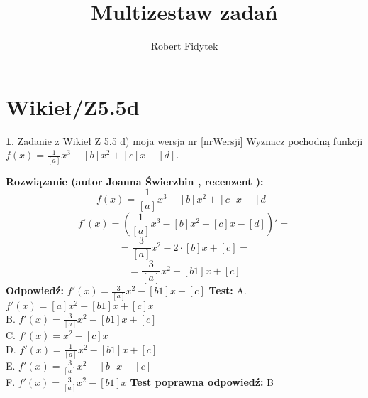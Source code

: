 \documentclass[12pt, a4paper]{article}
\title{Multizestaw zadań}
\author{Robert Fidytek}
\date{}
\theoremstyle{definition} %
\newtheorem{zad}{}
\newcommand{\kategoria}[1]{\section{#1}} %
\newcommand{\zadStart}[1]{\begin{zad}#1\newline} %
\newcommand{\zadStop}{\end{zad}}   %
\newcommand{\rozwStart}[2]{\noindent \textbf{Rozwiązanie (autor #1 , recenzent #2): }\newline} %
\newcommand{\rozwStop}{\newline}                                            %
\newcommand{\odpStart}{\noindent \textbf{Odpowiedź:}\newline}    %
\newcommand{\odpStop}{\newline}                                             %
\newcommand{\testStart}{\noindent \textbf{Test:}\newline} %
\newcommand{\testStop}{\newline} %
\newcommand{\kluczStart}{\noindent \textbf{Test poprawna odpowiedź:}\newline} %
\newcommand{\kluczStop}{\newline} %
\begin{document}
\maketitle


\kategoria{Wikieł/Z5.5d}
\zadStart{Zadanie z Wikieł Z 5.5 d) moja wersja nr [nrWersji]}
%
Wyznacz pochodną funkcji \\ $f(x)=\frac{1}{[a]}x^3-[b]x^2+[c]x-[d]$.
\zadStop
\rozwStart{Joanna Świerzbin}{}
$$f(x)=\frac{1}{[a]}x^3-[b]x^2+[c]x-[d]$$
$$f'(x)=\left(\frac{1}{[a]}x^3-[b]x^2+[c]x-[d]\right)' = $$
$$ = \frac{3}{[a]}x^2-2\cdot[b]x+[c] = $$
$$ =  \frac{3}{[a]}x^2-[b1]x+[c] $$
\rozwStop
\odpStart
$ f'(x)=  \frac{3}{[a]}x^2-[b1]x+[c] $
\odpStop
\testStart
A.$ f'(x)= [a]x^2 - [b1]x+ [c]x $\\
B. $ f'(x)=  \frac{3}{[a]}x^2-[b1]x+[c] $ \\
C. $ f'(x)= x^2- [c]x $ \\
D. $ f'(x)=  \frac{1}{[a]}x^2-[b1]x+[c] $\\
E. $ f'(x)=  \frac{3}{[a]}x^2-[b]x+[c] $\\
F. $ f'(x)=  \frac{3}{[a]}x^2-[b1]x $
\testStop
\kluczStart
B
\kluczStop
\end{document}
